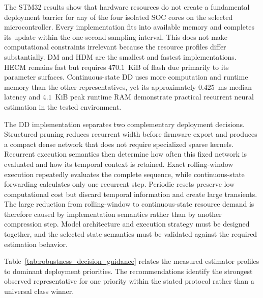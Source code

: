 The STM32 results show that hardware resources do not create a fundamental deployment barrier for any of the four isolated SOC cores on the selected microcontroller. Every implementation fits into available memory and completes its update within the one-second sampling interval. This does not make computational constraints irrelevant because the resource profiles differ substantially. DM and HDM are the smallest and fastest implementations. HECM remains fast but requires $470.1$~KiB of flash due primarily to its parameter surfaces. Continuous-state DD uses more computation and runtime memory than the other representatives, yet its approximately $0.425$~ms median latency and $4.1$~KiB peak runtime RAM demonstrate practical recurrent neural estimation in the tested environment.

The DD implementation separates two complementary deployment decisions. Structured pruning reduces recurrent width before firmware export and produces a compact dense network that does not require specialized sparse kernels. Recurrent execution semantics then determine how often this fixed network is evaluated and how its temporal context is retained. Exact rolling-window execution repeatedly evaluates the complete sequence, while continuous-state forwarding calculates only one recurrent step. Periodic resets preserve low computational cost but discard temporal information and create large transients. The large reduction from rolling-window to continuous-state resource demand is therefore caused by implementation semantics rather than by another compression step. Model architecture and execution strategy must be designed together, and the selected state semantics must be validated against the required estimation behavior.

Table~\ref{tab:robustness_decision_guidance} relates the measured estimator profiles to dominant deployment priorities. The recommendations identify the strongest observed representative for one priority within the stated protocol rather than a universal class winner.

